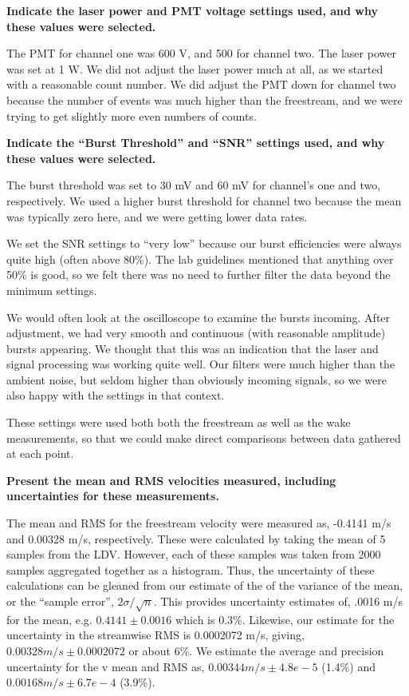 \documentclass{article}
\begin{document}
\textbf{Indicate the laser power and PMT voltage settings used, and why
these values were selected.} 

The PMT for channel one was 600 V, and 500 for channel two. The laser
power was set at 1 W. We did not adjust the laser power much at all, as
we started with a reasonable count number. We did adjust the PMT down
for channel two because the number of events was much higher than the
freestream, and we were trying to get slightly more even numbers of
counts. 

\textbf{Indicate the ``Burst Threshold'' and ``SNR'' settings used, and why
these values were selected.} 


The burst threshold was set to 30 mV and 60 mV for channel's one and
two, respectively. We used a higher burst threshold for channel two
because the mean was typically zero here, and we were getting lower data
rates. 

We set the SNR settings to ``very low'' because our burst efficiencies
were always quite high (often above 80\%). The lab guidelines mentioned
that anything over 50\% is good, so we felt there was no need to further
filter the data beyond the minimum settings. 

We would often look at the oscilloscope to examine the bursts incoming. 
After adjustment, we had very smooth and continuous (with reasonable
amplitude) bursts appearing. We thought that this was an indication that
the laser and signal processing was working quite well. Our filters were
much higher than the ambient noise, but seldom higher than obviously
incoming signals, so we were also happy with the settings in that
context. 

These settings were used both both the freestream as well as the wake
measurements, so that we could make direct comparisons between data
gathered at each point. 

%
%
%

\textbf{Present the mean and RMS velocities measured, including
uncertainties for these measurements.} 

The mean and RMS for the freestream velocity were measured as, 
-0.4141 m/s and 0.00328 m/s, respectively. These were calculated by
taking the mean of 5 samples from the LDV. However, each of these
samples was taken from 2000 samples aggregated together as a
histogram. Thus, the uncertainty of these calculations
can be gleaned from our estimate of the of the variance of the mean, or
the ``sample error'', $2\sigma/\sqrt{n}$. This provides uncertainty
estimates of, .0016 m/s for the mean, e.g. $0.4141 \pm
0.0016$ which is 0.3\%. Likewise, our estimate for the uncertainty in the
streamwise RMS is 0.0002072 m/s, giving, $0.00328 m/s \pm 0.0002072$ or
about 6\%. We estimate the average and precision uncertainty for the v
mean and RMS as, $0.00344 m/s \pm 4.8e-5$ (1.4\%) and $0.00168 m/s \pm
6.7e-4$ (3.9\%). 
\end{document}

